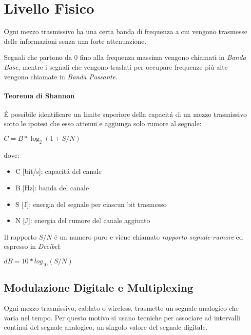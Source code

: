 \documentclass[12pt]{article}
\begin{document}
\date{}
\title{\vspace{-11ex}} %
 
\maketitle

\section{Livello Fisico}\label{fisico}
Ogni mezzo trasmissivo ha una certa banda di frequenza a cui vengono trasmesse delle informazioni senza una forte 
attenuazione.

Segnali che partono da 0 fino alla frequenza massima vengono chiamati in \textit{Banda Base}, mentre i segnali che 
vengono traslati per occupare frequenze pi\'u alte vengono chiamate in \textit{Banda Passante}.

\paragraph{Teorema di Shannon} \'E possibile identificare un limite superiore della capacit\'a di un mezzo trasmissivo
sotto le ipotesi che esso attenui e aggiunga solo rumore al segnale:
\begin{center}
    $ C = B*\log_2(1+S/N) $
\end{center}
dove:
\begin{itemize}[noitemsep]
    \item C [bit/s]: capacit\'a del canale
    \item B [Hz]: banda del canale
    \item S [J]: energia del segnale per ciascun bit trasmesso
    \item N [J]: energia del rumore del canale aggiunto
\end{itemize}
Il rapporto $S/N$ \'e un numero puro e viene chiamato \textit{rapporto segnale-rumore} ed espresso in \textit{Decibel}:
\begin{center}
    $ dB = 10 * log_{10}(S/N) $
\end{center}
\clearpage


\subsection{Modulazione Digitale e Multiplexing}
Ogni mezzo trasmissivo, cablato o wireless, trasmette un segnale analogico che varia nel tempo. Per questo motivo si
usano tecniche per associare ad intervalli continui del segnale analogico, un singolo valore del segnale digitale.
\end{document}
